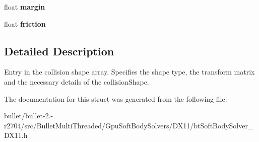 \begin{DoxyCompactItemize}
\item 
\hypertarget{structbt_d_x11_soft_body_solver_1_1_collision_shape_description_aa66a5d799d0f5914fec2a6db3f844d97}{float {\bfseries margin}}\label{structbt_d_x11_soft_body_solver_1_1_collision_shape_description_aa66a5d799d0f5914fec2a6db3f844d97}

\item 
\hypertarget{structbt_d_x11_soft_body_solver_1_1_collision_shape_description_aebac2abd3e3f87bd66f20a88c23af651}{float {\bfseries friction}}\label{structbt_d_x11_soft_body_solver_1_1_collision_shape_description_aebac2abd3e3f87bd66f20a88c23af651}

\end{DoxyCompactItemize}


\subsection{Detailed Description}
Entry in the collision shape array. Specifies the shape type, the transform matrix and the necessary details of the collision\+Shape. 

The documentation for this struct was generated from the following file\+:\begin{DoxyCompactItemize}
\item 
bullet/bullet-\/2.-\/r2704/src/\+Bullet\+Multi\+Threaded/\+Gpu\+Soft\+Body\+Solvers/\+D\+X11/bt\+Soft\+Body\+Solver\+\_\+\+D\+X11.\+h\end{DoxyCompactItemize}
